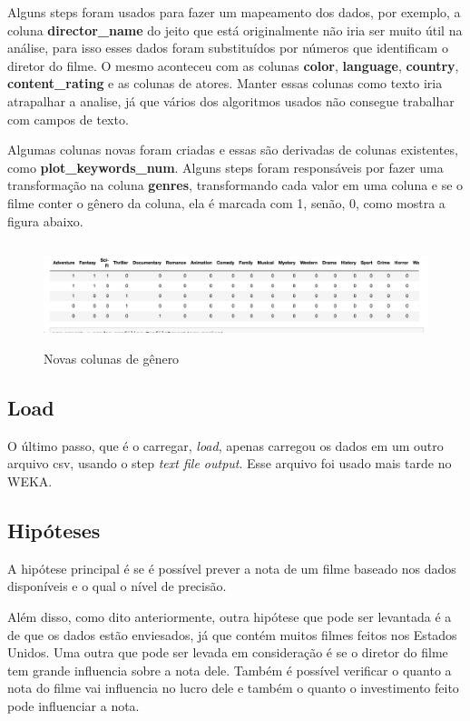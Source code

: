 Alguns steps foram usados para fazer um mapeamento dos dados, por exemplo, a coluna \textbf{director\_name} do jeito que está originalmente não iria ser muito útil na análise, para isso esses dados foram substituídos por números que identificam o diretor do filme. O mesmo aconteceu com as colunas \textbf{color}, \textbf{language}, \textbf{country}, \textbf{content\_rating} e as colunas de atores. Manter essas colunas como texto iria atrapalhar a analise, já que vários dos algoritmos usados não consegue trabalhar com campos de texto.

Algumas colunas novas foram criadas e essas são derivadas de colunas existentes, como \textbf{plot\_keywords\_num}. Alguns steps foram responsáveis por fazer uma transformação na coluna \textbf{genres}, transformando cada valor em uma coluna e se o filme conter o gênero da coluna, ela é marcada com 1, senão, 0, como mostra a figura abaixo.

\begin{figure}[H]
\centering
\includegraphics[height=3cm]{imagens/genres.png}
\caption{Novas colunas de gênero}
\label{figura 28}
\end{figure}

\subsection{Load}
O último passo, que é o carregar, \textit{load}, apenas carregou os dados em um outro arquivo csv, usando o step \textit{text file output}. Esse arquivo foi usado mais tarde no WEKA.

\subsection{Hipóteses}
A hipótese principal é se é possível prever a nota de um filme baseado nos dados disponíveis e o qual o nível de precisão.

Além disso, como dito anteriormente, outra hipótese que pode ser levantada é a de que os dados estão enviesados, já que contém muitos filmes feitos nos Estados Unidos. Uma outra que pode ser levada em consideração é se o diretor do filme tem grande influencia sobre a nota dele. Também é possível verificar o quanto a nota do filme vai influencia no lucro dele e também o quanto o investimento feito pode influenciar a nota.

